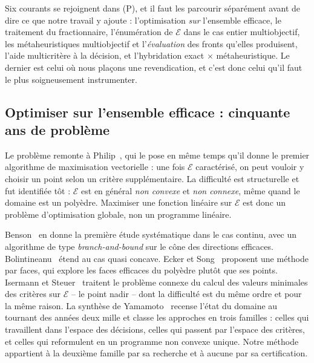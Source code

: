 \documentclass[11pt,a4paper]{article}
\theoremstyle{plain}
\theoremstyle{remark}
\newcommand{\Ecal}{\mathcal{E}}
\begin{document}
Six courants se rejoignent dans (P), et il faut les parcourir séparément
avant de dire ce que notre travail y ajoute : l'optimisation \emph{sur}
l'ensemble efficace, le traitement du fractionnaire, l'énumération de
$\Ecal$ dans le cas entier multiobjectif, les métaheuristiques
multiobjectif et l'\emph{évaluation} des fronts qu'elles produisent,
l'aide multicritère à la décision, et l'hybridation exact
$\times$ métaheuristique. Le dernier est celui où nous plaçons une
revendication, et c'est donc celui qu'il faut le plus soigneusement
instrumenter.

\subsection{Optimiser sur l'ensemble efficace : cinquante ans de problème}

Le problème remonte à Philip~\cite{philip1972}, qui le pose en même temps
qu'il donne le premier algorithme de maximisation vectorielle : une fois
$\Ecal$ caractérisé, on peut vouloir y choisir un point selon un critère
supplémentaire. La difficulté est structurelle et fut identifiée tôt :
$\Ecal$ est en général \emph{non convexe} et \emph{non connexe}, même quand
le domaine est un polyèdre. Maximiser une fonction linéaire sur $\Ecal$ est
donc un problème d'optimisation globale, non un programme linéaire.

Benson~\cite{benson1984,benson1986} en donne la première étude
systématique dans le cas continu, avec un algorithme de type
\emph{branch-and-bound} sur le cône des directions efficaces.
Bolintineanu~\cite{bolintineanu1993} étend au cas quasi concave.
Ecker et Song~\cite{eckersong1994} proposent une méthode par faces, qui
explore les faces efficaces du polyèdre plutôt que ses points.
Isermann et Steuer~\cite{isermann1988} traitent le problème connexe du
calcul des valeurs minimales des critères sur $\Ecal$ -- le point nadir --
dont la difficulté est du même ordre et pour la même raison.
La synthèse de Yamamoto~\cite{yamamoto2002} recense l'état du domaine au
tournant des années deux mille et classe les approches en trois familles :
celles qui travaillent dans l'espace des décisions, celles qui passent par
l'espace des critères, et celles qui reformulent en un programme
non convexe unique. Notre méthode appartient à la deuxième famille par sa
recherche et à aucune par sa certification.
\end{document}

